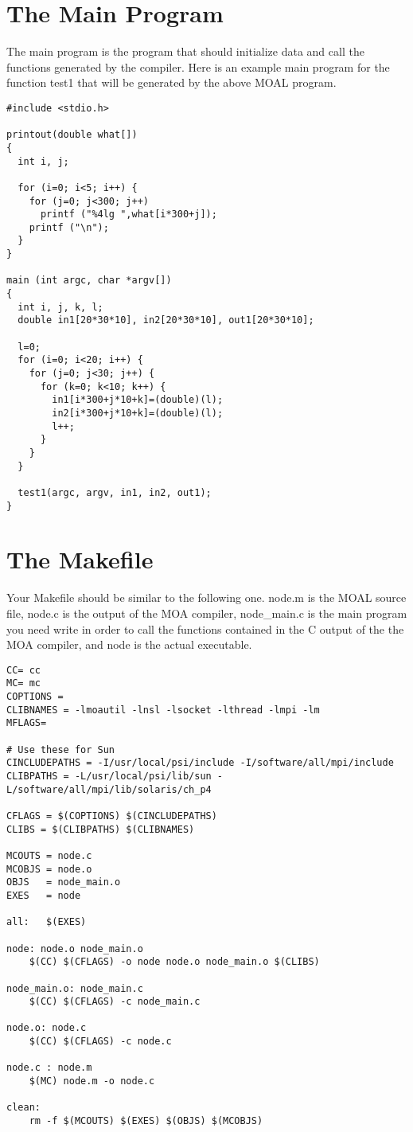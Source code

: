 \section{The Main Program}
The main program is the program that should initialize data and call the
functions generated by the compiler.  Here is an example main program for
the function test1 that will be generated by the above MOAL program.
{\samepage
\begin{verbatim}
#include <stdio.h>

printout(double what[])
{
  int i, j;

  for (i=0; i<5; i++) {
    for (j=0; j<300; j++) 
      printf ("%4lg ",what[i*300+j]);
    printf ("\n");
  }
}

main (int argc, char *argv[])
{
  int i, j, k, l;
  double in1[20*30*10], in2[20*30*10], out1[20*30*10];

  l=0;
  for (i=0; i<20; i++) {
    for (j=0; j<30; j++) {
      for (k=0; k<10; k++) {
        in1[i*300+j*10+k]=(double)(l);
        in2[i*300+j*10+k]=(double)(l);
        l++;
      }
    }
  }

  test1(argc, argv, in1, in2, out1);
}
\end{verbatim}
}
\section{The Makefile}
Your Makefile should be similar to the following one.  node.m is the MOAL
source file, node.c is the output of the MOA compiler, node\_main.c is
the main program you need write in order to call the functions contained in
the C output of the the MOA compiler, and node is the actual executable.  
{\samepage
\begin{verbatim}
CC= cc
MC= mc
COPTIONS = 
CLIBNAMES = -lmoautil -lnsl -lsocket -lthread -lmpi -lm
MFLAGS=

# Use these for Sun
CINCLUDEPATHS = -I/usr/local/psi/include -I/software/all/mpi/include
CLIBPATHS = -L/usr/local/psi/lib/sun -L/software/all/mpi/lib/solaris/ch_p4

CFLAGS = $(COPTIONS) $(CINCLUDEPATHS)
CLIBS = $(CLIBPATHS) $(CLIBNAMES)

MCOUTS = node.c 
MCOBJS = node.o 
OBJS   = node_main.o 
EXES   = node

all:   $(EXES)

node: node.o node_main.o
	$(CC) $(CFLAGS) -o node node.o node_main.o $(CLIBS)

node_main.o: node_main.c
	$(CC) $(CFLAGS) -c node_main.c

node.o: node.c
	$(CC) $(CFLAGS) -c node.c

node.c : node.m
	$(MC) node.m -o node.c

clean:
	rm -f $(MCOUTS) $(EXES) $(OBJS) $(MCOBJS)
\end{verbatim}
}

